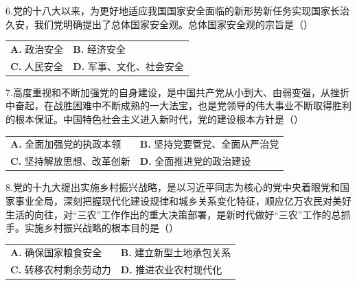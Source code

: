 \documentclass[UTF8,11pt]{ctexart}
\begin{document}
6.党的十八大以来，为更好地适应我国国家安全面临的新形势新任务实现国家长治久安，我们党明确提出了总体国家安全观。总体国家安全观的宗旨是（）


\begin{center}\begin{tabular}{>{\raggedright\arraybackslash}p{\dimexpr(\linewidth-4\tabcolsep)/2\relax}>{\raggedright\arraybackslash}p{\dimexpr(\linewidth-4\tabcolsep)/2\relax}}
\textbf{A.} 政治安全 & \textbf{B.} 经济安全\\[.35em]
\textbf{C.} 人民安全 & \textbf{D.} 军事、文化、社会安全\\[.35em]\end{tabular}\end{center}

7.高度重视和不断加强党的自身建设，是中国共产党从小到大、由弱变强，从挫折中奋起，在战胜困难中不断成熟的一大法宝，也是党领导的伟大事业不断取得胜利的根本保证。中国特色社会主义进入新时代，党的建设根本方针是（）


\begin{center}\begin{tabular}{>{\raggedright\arraybackslash}p{\dimexpr(\linewidth-4\tabcolsep)/2\relax}>{\raggedright\arraybackslash}p{\dimexpr(\linewidth-4\tabcolsep)/2\relax}}
\textbf{A.} 全面加强党的执政本领 & \textbf{B.} 坚持党要管党、全面从严治党\\[.35em]
\textbf{C.} 坚持解放思想、改革创新 & \textbf{D.} 全面推进党的政治建设\\[.35em]\end{tabular}\end{center}

8.党的十九大提出实施乡村振兴战略，是以习近平同志为核心的党中央着眼党和国家事业全局，深刻把握现代化建设规律和城乡关系变化特征，顺应亿万农民对美好生活的向往，对“三农”工作作出的重大决策部署，是新时代做好“三农”工作的总抓手。实施乡村振兴战略的根本目的是（）


\begin{center}\begin{tabular}{>{\raggedright\arraybackslash}p{\dimexpr(\linewidth-4\tabcolsep)/2\relax}>{\raggedright\arraybackslash}p{\dimexpr(\linewidth-4\tabcolsep)/2\relax}}
\textbf{A.} 确保国家粮食安全 & \textbf{B.} 建立新型土地承包关系\\[.35em]
\textbf{C.} 转移农村剩余劳动力 & \textbf{D.} 推进农业农村现代化\\[.35em]\end{tabular}\end{center}
\end{document}
